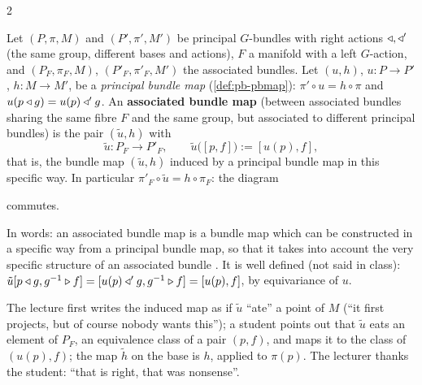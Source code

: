 \begin{paracol}{2}
\begin{definition}\label{def:ab-map}
Let $(P,\pi,M)$ and $(P',\pi',M')$ be principal $G$-bundles with right actions $\mathbin{\triangleleft},\mathbin{\triangleleft}'$ (the same group, different bases and actions), $F$ a manifold with a left $G$-action, and $(P_F,\pi_F,M)$, $(P'_F,\pi'_F,M')$ the associated bundles. Let $(u,h)$, $u\colon P\to P'$, $h\colon M\to M'$, be a \emph{principal bundle map} (\cref{def:pb-pbmap}): $\pi'\circ u=h\circ\pi$ and $u(p\mathbin{\triangleleft} g)=u(p)\mathbin{\triangleleft}'g$. An \textbf{associated bundle map} (between associated bundles sharing the same fibre $F$ and the same group, but associated to different principal bundles) is the pair $(\tilde u,h)$ with
\[
  \tilde u\colon P_F\to P'_F,\qquad\tilde u\bigl([p,f]\bigr):=[u(p),f] ,
\]
that is, the bundle map $(\tilde u,h)$ induced by a principal bundle map in this specific way. In particular $\pi'_F\circ\tilde u=h\circ\pi_F$: the diagram
\begin{center}
\end{center}
commutes.                       
\end{definition}
In words: an associated bundle map is a bundle map which can be constructed in a specific way from a principal bundle map, so that it takes into account the very specific structure of an associated bundle    . It is well defined (not said in class): $\tilde u[p\mathbin{\triangleleft} g,g^{-1}\mathbin{\triangleright} f]=[u(p)\mathbin{\triangleleft}'g,g^{-1}\mathbin{\triangleright} f]=[u(p),f]$, by equivariance of $u$.
\begin{coursenote}
The lecture first writes the induced map as if $\tilde u$ ``ate'' a point of $M$ (``it first projects, but of course nobody wants this''); a student points out that $\tilde u$ eats an element of $P_F$, an equivalence class of a pair $(p,f)$, and maps it to the class of $(u(p),f)$; the map $\tilde h$ on the base is $h$, applied to $\pi(p)$. The lecturer thanks the student: ``that is right, that was nonsense''. 

\end{coursenote}
\end{paracol}
